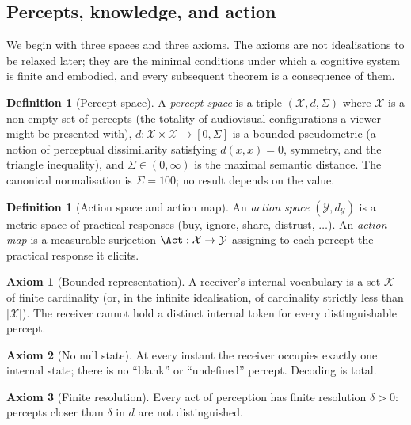 \documentclass[twocolumn,11pt,a4paper]{article}
\theoremstyle{adv}
\theoremstyle{definition}
\newtheorem{definition}[theorem]{Definition}
\newtheorem{axiom}{Axiom}
\theoremstyle{remark}
\newcommand{\Out}{\mathcal{X}}         %
\newcommand{\Know}{\mathcal{K}}        %
\newcommand{\Acts}{\mathcal{Y}}        %
\newcommand{\dist}{d}
\newcommand{\Sig}{\Sigma}
\begin{document}
\subsection{Percepts, knowledge, and action}

We begin with three spaces and three axioms. The axioms are not
idealisations to be relaxed later; they are the minimal conditions under
which a cognitive system is finite and embodied, and every subsequent
theorem is a consequence of them.

\begin{definition}[Percept space]
\label{def:percept}
A \emph{percept space} is a triple $(\Out,\dist,\Sig)$ where $\Out$ is a
non-empty set of percepts (the totality of audiovisual configurations a
viewer might be presented with), $\dist:\Out\times\Out\to[0,\Sig]$ is a
bounded pseudometric (a notion of perceptual dissimilarity satisfying
$\dist(x,x)=0$, symmetry, and the triangle inequality), and
$\Sig\in(0,\infty)$ is the maximal semantic distance. The canonical
normalisation is $\Sig=100$; no result depends on the value.
\end{definition}

\begin{definition}[Action space and action map]
\label{def:action}
An \emph{action space} $(\Acts,\dist_\Acts)$ is a metric space of
practical responses (buy, ignore, share, distrust, $\dots$). An
\emph{action map} is a measurable surjection
$\Act:\Out\to\Acts$ assigning to each percept the practical response it
elicits.
\end{definition}

\begin{axiom}[Bounded representation]
\label{ax:bounded}
A receiver's internal vocabulary is a set $\Know$ of finite cardinality
(or, in the infinite idealisation, of cardinality strictly less than
$|\Out|$). The receiver cannot hold a distinct internal token for every
distinguishable percept.
\end{axiom}

\begin{axiom}[No null state]
\label{ax:null}
At every instant the receiver occupies exactly one internal state; there
is no ``blank'' or ``undefined'' percept. Decoding is total.
\end{axiom}

\begin{axiom}[Finite resolution]
\label{ax:resolution}
Every act of perception has finite resolution $\delta>0$: percepts closer
than $\delta$ in $\dist$ are not distinguished.
\end{axiom}
\end{document}

